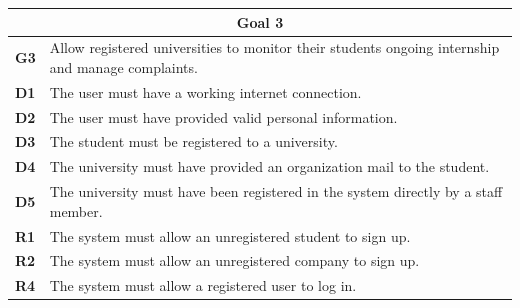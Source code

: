 \begin{table}[H]
    \centering
    \begin{tabular}{|l|m{10cm}|}
        \hline \multicolumn{2}{|c|}{\textbf{Goal 3}} \\
        \hline \textbf{G3} & Allow registered universities to monitor their students ongoing internship and manage complaints. \\
        \hline \textbf{D1} & The user must have a working internet connection. \\
        \hline \textbf{D2} & The user must have provided valid personal information. \\
        \hline \textbf{D3} & The student must be registered to a university. \\
        \hline \textbf{D4} & The university must have provided an organization mail to the student. \\
        \hline \textbf{D5} & The university must have been registered in the system directly by a staff member. \\
        \hline \textbf{R1} & The system must allow an unregistered student to sign up.\\
        \hline \textbf{R2} & The system must allow an unregistered company to sign up. \\
        \hline \textbf{R4} & The system must allow a registered user to log in. \\

\end{tabular}
\end{table}
